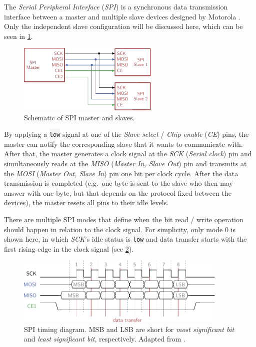 The \emph{Serial Peripheral Interface} (\emph{SPI}) is a synchronous
data transmission interface between a master and multiple slave devices
designed by Motorola \citep{dembowski-raspi}. Only the independent slave
configuration will be discussed here, which can be seen in
\cref{fig:spi-schematic}.

\begin{figure}
\centering
\includegraphics[width=0.60000\textwidth]{Bilder/spi-schematic.pdf}
\caption[Schematic of SPI master and slaves]{Schematic of SPI master and slaves.}\label{fig:spi-schematic}
\end{figure}

By applying a \colorbox{WhiteSmoke}{\lstinline!low!} signal at one of the \emph{Slave select} /
\emph{Chip enable} (\emph{CE}) pins, the master can notify the
corresponding slave that it wants to communicate with. After that, the
master generates a clock signal at the \emph{SCK} (\emph{Serial clock})
pin and simultaneously reads at the \emph{MISO} (\emph{Master In, Slave
Out}) pin and transmits at the \emph{MOSI} (\emph{Master Out, Slave In})
pin one bit per clock cycle. After the data transmission is completed
(e.g.~one byte is sent to the slave who then may answer with one byte,
but that depends on the protocol fixed between the devices), the master
resets all pins to their idle levels.

There are multiple SPI modes that define when the bit read / write
operation should happen in relation to the clock signal. For simplicity,
only mode 0 is shown here, in which \emph{SCK}'s idle status is
\colorbox{WhiteSmoke}{\lstinline!low!} and data transfer starts with the first rising edge in
the clock signal (see \cref{fig:spi-timing}).

\begin{figure}
\centering
\includegraphics[width=0.90000\textwidth]{Bilder/spi-timing.pdf}
\caption[SPI timing diagram]{SPI timing diagram. MSB and LSB are short for \emph{most
significant bit} and \emph{least significant bit}, respectively. Adapted
from \citep{dembowski-raspi}.}\label{fig:spi-timing}
\end{figure}

